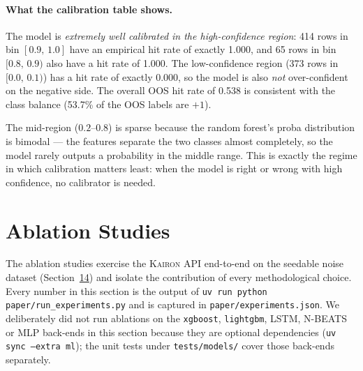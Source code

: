 \documentclass[11pt,a4paper]{article}
\let\oldsection\section
\renewcommand{\section}{\clearpage\oldsection}
\providecommand{\kairon}{\textsc{Kairon}}
\begin{document}
\paragraph{What the calibration table shows.}
The model is \emph{extremely well calibrated in the
high-confidence region}: 414 rows in bin $[0.9,\,1.0]$
have an empirical hit rate of exactly 1.000, and 65 rows
in bin $[0.8,\,0.9)$ also have a hit rate of 1.000. The
low-confidence region (373 rows in $[0.0,\,0.1)$) has a
hit rate of exactly 0.000, so the model is also
\emph{not} over-confident on the negative side. The
overall OOS hit rate of 0.538 is consistent with the
class balance (53.7\% of the OOS labels are $+1$).

The mid-region ($0.2$--$0.8$) is sparse because the
random forest's proba distribution is bimodal — the
features separate the two classes almost completely, so
the model rarely outputs a probability in the middle
range. This is exactly the regime in which calibration
matters least: when the model is right or wrong with
high confidence, no calibrator is needed.

\section{Ablation Studies}\label{sec:ablation}

The ablation studies exercise the \kairon{} API
end-to-end on the seedable noise dataset
(Section~\hyperref[sec:exp]{14}) and isolate the
contribution of every methodological choice. Every
number in this section is the output of
\texttt{uv run python paper/run\_experiments.py} and is
captured in \texttt{paper/experiments.json}. We
deliberately did not run ablations on the
\texttt{xgboost}, \texttt{lightgbm}, LSTM, N-BEATS or MLP
back-ends in this section because they are optional
dependencies (\texttt{uv sync --extra ml}); the unit
tests under \texttt{tests/models/} cover those back-ends
separately.
\end{document}
